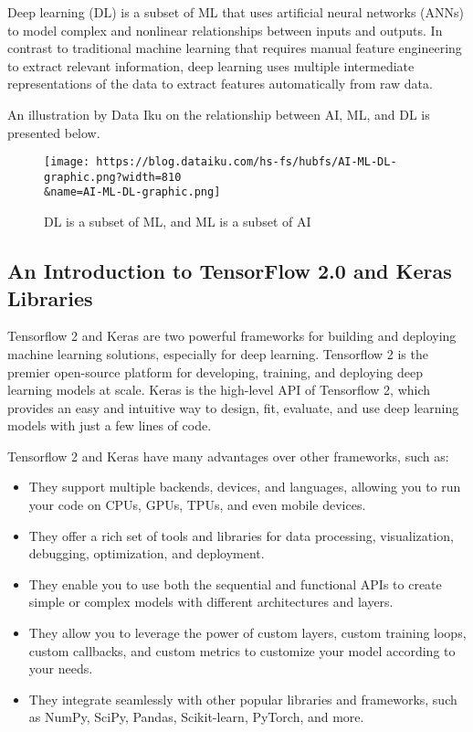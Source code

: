 \documentclass[
  letterpaper,
  DIV=11,
  numbers=noendperiod]{scrreprt}
\providecommand{\tightlist}{%
  \setlength{\itemsep}{0pt}\setlength{\parskip}{0pt}}\usepackage{longtable,booktabs,array}
\begin{document}
Deep learning (DL) is a subset of ML that uses artificial neural
networks (ANNs) to model complex and nonlinear relationships between
inputs and outputs. In contrast to traditional machine learning that
requires manual feature engineering to extract relevant information,
deep learning uses multiple intermediate representations of the data to
extract features automatically from raw data.

An illustration by Data Iku on the relationship between AI, ML, and DL
is presented below.

\begin{figure}

{\centering \texttt{[image: https://blog.dataiku.com/hs-fs/hubfs/AI-ML-DL-graphic.png?width=810\\\&name=AI-ML-DL-graphic.png]}

}

\caption{DL is a subset of ML, and ML is a subset of AI}

\end{figure}

\hypertarget{an-introduction-to-tensorflow-2.0-and-keras-libraries}{%
\subsection*{An Introduction to TensorFlow 2.0 and Keras
Libraries}\label{an-introduction-to-tensorflow-2.0-and-keras-libraries}}

Tensorflow 2 and Keras are two powerful frameworks for building and
deploying machine learning solutions, especially for deep learning.
Tensorflow 2 is the premier open-source platform for developing,
training, and deploying deep learning models at scale. Keras is the
high-level API of Tensorflow 2, which provides an easy and intuitive way
to design, fit, evaluate, and use deep learning models with just a few
lines of code.

Tensorflow 2 and Keras have many advantages over other frameworks, such
as:

\begin{itemize}
\tightlist
\item
  They support multiple backends, devices, and languages, allowing you
  to run your code on CPUs, GPUs, TPUs, and even mobile devices.
\item
  They offer a rich set of tools and libraries for data processing,
  visualization, debugging, optimization, and deployment.
\item
  They enable you to use both the sequential and functional APIs to
  create simple or complex models with different architectures and
  layers.
\item
  They allow you to leverage the power of custom layers, custom training
  loops, custom callbacks, and custom metrics to customize your model
  according to your needs.
\item
  They integrate seamlessly with other popular libraries and frameworks,
  such as NumPy, SciPy, Pandas, Scikit-learn, PyTorch, and more.
\end{itemize}
\end{document}
